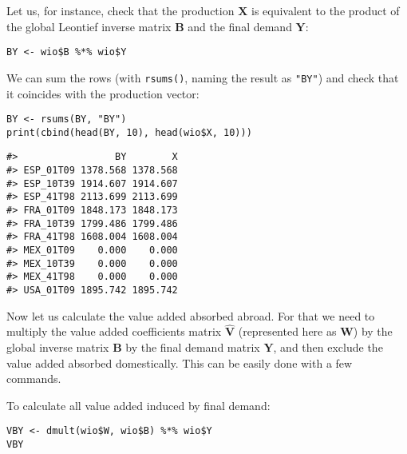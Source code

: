 Let us, for instance, check that the production \(\mathbf{X}\) is equivalent to
the product of the global Leontief inverse matrix \(\mathbf{B}\) and the final
demand \(\mathbf{Y}\):

\begin{verbatim}
BY <- wio$B %*% wio$Y
\end{verbatim}

We can sum the rows (with \texttt{rsums()}, naming the result as \texttt{"BY"}) and check that
it coincides with the production vector:

\begin{verbatim}
BY <- rsums(BY, "BY")
print(cbind(head(BY, 10), head(wio$X, 10)))
\end{verbatim}

\begin{verbatim}
#>                 BY        X
#> ESP_01T09 1378.568 1378.568
#> ESP_10T39 1914.607 1914.607
#> ESP_41T98 2113.699 2113.699
#> FRA_01T09 1848.173 1848.173
#> FRA_10T39 1799.486 1799.486
#> FRA_41T98 1608.004 1608.004
#> MEX_01T09    0.000    0.000
#> MEX_10T39    0.000    0.000
#> MEX_41T98    0.000    0.000
#> USA_01T09 1895.742 1895.742
\end{verbatim}

Now let us calculate the value added absorbed abroad. For that we need to
multiply the value added coefficients matrix \(\hat{\mathbf{V}}\) (represented
here as \(\mathbf{W}\)) by the global inverse matrix \(\mathbf{B}\) by the final
demand matrix \(\mathbf{Y}\), and then exclude the value added absorbed
domestically. This can be easily done with a few commands.

To calculate all value added induced by final demand:

\begin{verbatim}
VBY <- dmult(wio$W, wio$B) %*% wio$Y
VBY
\end{verbatim}

